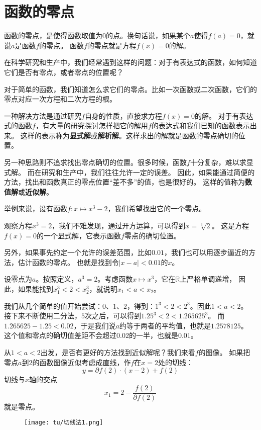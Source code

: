 \documentclass[12pt,UTF8]{ctexbook}
\begin{document}
\section{函数的零点}

函数的零点，是使得函数取值为$0$的点。换句话说，如果某个$a$使得$f(a) = 0$，就说$a$是函数$f$的零点。
函数$f$的零点就是方程$f(x) = 0$的解。

在科学研究和生产中，我们经常遇到这样的问题：对于有表达式的函数，如何知道它们是否有零点，或者零点的位置呢？

对于简单的函数，我们知道怎么求它们的零点。比如一次函数或二次函数，它们的零点对应一次方程和二次方程的根。

一种解决方法是通过研究$f$自身的性质，直接求方程$f(x) = 0$的解。
对于有表达式的函数$f$，有大量的研究探讨怎样把它的解用$f$的表达式和我们已知的函数表示出来。
这样的表示称为\textbf{显式解}或\textbf{解析解}。这样求出的解就是函数的零点确切的位置。

另一种思路则不追求找出零点确切的位置。很多时候，函数$f$十分复杂，难以求显式解。
而在研究和生产中，我们往往允许一定的误差。
因此，如果能通过简便的方法，找出和函数真正的零点位置“差不多”的值，也是很好的。
这样的值称为\textbf{数值解}或\textbf{近似解}。

举例来说，设有函数$f: x\mapsto x^3 - 2$，我们希望找出它的一个零点。

观察方程$x^3 = 2$，我们不难发现，通过开方运算，可以得到$x = \sqrt[3]{2}$。
这是方程$f(x) = 0$的一个显式解，它表示函数$f$零点的确切位置。

另外，如果事先约定一个允许的误差范围，比如$0.01$，我们也可以用逐步逼近的方法，估计函数的零点。
也就是找到令$|x - a| < 0.01$的$x$。

设零点为$a$。按照定义，$a^3 = 2$。考虑函数$x\mapsto x^3$，它在$\mathbb{R}$上严格单调递增，
因此，如果能找到$x_1^3 < 2 < x_2^3$，就说明$x_1 < a < x_2$。

我们从几个简单的值开始尝试：$0$、$1$、$2$，得到：$1^3 < 2 < 2^3$。因此$1 < a < 2$。
接下来不断使用二分法，$5$次之后，可以得到$1.25^3 < 2 < 1.265625^3$。
而$1.265625 - 1.25 < 0.02$，于是我们说$a$约等于两者的平均值，也就是$1.2578125$。
这个值和零点的确切值差距不会超过$0.02$的一半，也就是$0.01$。

从$1 < a < 2$出发，是否有更好的方法找到近似解呢？我们来看$f$的图像。
如果把零点$a$到$2$的函数图像近似考虑成直线，作$f$在$x=2$处的切线：
$$ y = \partial f(2)\cdot (x - 2) + f(2) $$
切线与$x$轴的交点
$$ x_1 = 2 - \frac{f(2)}{\partial f(2)} $$
就是零点。

\begin{figure}[h]
    \vspace{4pt}
    \centering
    \texttt{[image: tu/切线法1.png]}
\end{figure}
\end{document}
